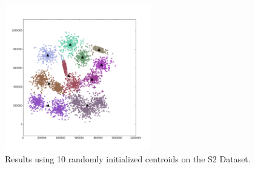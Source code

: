 \documentclass[journal]{IEEEtran}
\begin{document}
\begin{figure}[!t]
	\centering
	\includegraphics[width=2.5in]{../figs/s2_rand_euclid_10.png}
	\caption{Results using 10 randomly initialized centroids on the S2 Dataset.}
	\label{fig_sim}
\end{figure}
\end{document}
